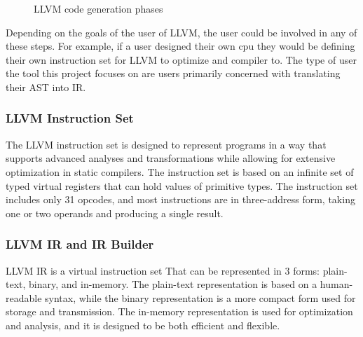 \documentclass[hidelinks,12pt]{article}
\begin{document}
\begin{doublespacing}
\begin{figure}[ht]
    \label{fig:front-end}
\end{figure}

\begin{figure}[ht]
    \centering
    \caption{LLVM code generation phases}
    \label{fig:LLVM diagram}
\end{figure}

\vspace{1cm}
Depending on the goals of the user of LLVM, the user could be involved in any of these steps. For example, if a user designed their own cpu they would be defining their own instruction set for LLVM to optimize and compiler to. The type of user the tool this project focuses on are users primarily concerned with translating their AST into IR. 

\subsubsection{LLVM Instruction Set}
The LLVM instruction set is designed to represent programs in a way that supports advanced analyses and transformations while allowing for extensive optimization in static compilers. The instruction set is based on an infinite set of typed virtual registers that can hold values of primitive types. The instruction set includes only 31 opcodes, and most instructions are in three-address form, taking one or two operands and producing a single result.
\cite{noauthor_llvm_2023}

\subsubsection{LLVM IR and IR Builder}
LLVM IR is a virtual instruction set That can be represented in 3 forms: plain-text, binary, and in-memory. The plain-text representation is based on a human-readable syntax, while the binary representation is a more compact form used for storage and transmission. The in-memory representation is used for optimization and analysis, and it is designed to be both efficient and flexible.
\cite{noauthor_llvm_2023}


\end{doublespacing}
\end{document}
